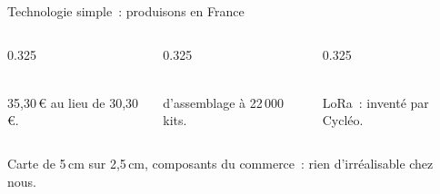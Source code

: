 \begin{frame}{Technologie simple~: produisons en France}
  \vspace{-0.45cm}
  \begin{columns}[T]
    \begin{column}{0.325\textwidth}
      \begin{carte}[height=1.05cm,valign=top]
        \raggedright{}\\[1pt]
        {\footnotesize 35,30\,€ au lieu de 30,30\,€.}
      \end{carte}
    \end{column}
    \begin{column}{0.325\textwidth}
      \begin{carte}[height=1.05cm,valign=top]
        \raggedright{}\\[1pt]
        {\footnotesize d'assemblage à 22\,000 kits.}
      \end{carte}
    \end{column}
    \begin{column}{0.325\textwidth}
      \begin{carte}[height=1.05cm,valign=top]
        \raggedright{}\\[1pt]
        {\footnotesize LoRa~: inventé par Cycléo.}
      \end{carte}
    \end{column}
  \end{columns}
  \vspace{0cm}
  \begin{pointcle}\centering\footnotesize
    Carte de 5\,cm sur 2,5\,cm, composants du commerce~: rien d'irréalisable chez nous.
  \end{pointcle}
\end{frame}

